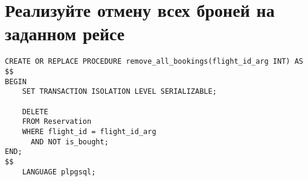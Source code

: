\documentclass{article}
\begin{document}
\section{Реализуйте отмену всех броней на заданном рейсе}

\begin{verbatim}
CREATE OR REPLACE PROCEDURE remove_all_bookings(flight_id_arg INT) AS
$$
BEGIN
    SET TRANSACTION ISOLATION LEVEL SERIALIZABLE;

    DELETE
    FROM Reservation
    WHERE flight_id = flight_id_arg
      AND NOT is_bought;
END;
$$
    LANGUAGE plpgsql;
\end{verbatim}
\end{document}
